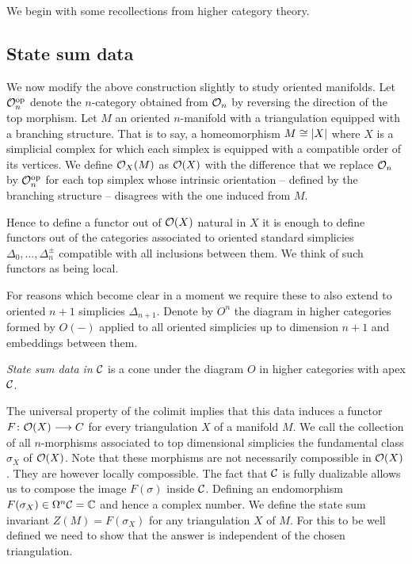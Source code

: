 We begin with some recollections from higher category theory.

\subsection{State sum data}

We now modify the above construction slightly to study oriented manifolds.
Let $\mathcal{O}_n^{\mathrm{op}}$ denote the $n$-category obtained from $\mathcal{O}_n$ by reversing the direction of the top morphism.
Let $M$ an oriented $n$-manifold with a triangulation equipped with a branching structure.
That is to say, a homeomorphism $M \cong \lvert X\rvert$ where $X$ is a simplicial complex for which each simplex is equipped with a compatible order of its vertices.
We define $\mathcal{O}_X(M)$ as $\mathcal{O}(X)$ with the difference that we replace $\mathcal{O}_n$ by $\mathcal{O}_n^{\mathrm{op}}$ for each top simplex whose intrinsic orientation -- defined by the branching structure -- disagrees with the one induced from $M$.

Hence to define a functor out of $\mathcal{O}(X)$ natural in $X$ it is enough to define functors out of the categories associated to oriented standard simplicies $\Delta_0, \dots, \Delta_n^\pm$ compatible with all inclusions between them.
We think of such functors as being local.

For reasons which become clear in a moment we require these to also extend to oriented $n+1$ simplicies $\Delta_{n+1}$.
Denote by $O^n$ the diagram in higher categories formed by $O(-)$ applied to all oriented simplicies up to dimension $n+1$ and embeddings between them.

\begin{definition}
	\emph{State sum data in $\mathcal{C}$} is a cone under the diagram $O$ in higher categories with apex $\mathcal{C}$.
\end{definition}

The universal property of the colimit implies that this data induces a functor $F \colon \mathcal{O}(X) \longrightarrow C$ for every triangulation $X$ of a manifold $M$.
We call the collection of all $n$-morphisms associated to top dimensional simplicies the fundamental class $\sigma_X$ of $\mathcal{O}(X)$.
Note that these morphisms are not necessarily compossible in $\mathcal{O}(X)$.
They are however locally compossible.
The fact that $\mathcal{C}$ is fully dualizable
allows us to compose the image $F(\sigma)$ inside $\mathcal{C}$.
Defining an endomorphism
$F(\sigma_X)\in \Omega^n\mathcal{C}=\mathbb{C} $ and hence a complex number.
We define the state sum invariant $Z(M)=F(\sigma_X)$ for any triangulation $X$ of $M$.
For this to be well defined we need to show that the answer is independent of the chosen triangulation.

